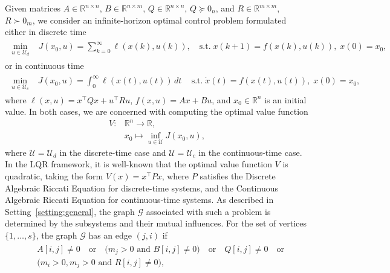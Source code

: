 \documentclass{article}
\newcommand{\R}{\mathbb{R}}
\newcommand{\Rn}{\R^n}
\begin{document}
Given matrices $A \in \mathbb{R}^{n \times n}$, $B \in \mathbb{R}^{n \times m}$, $Q \in \mathbb{R}^{n \times n}$, $Q\succeq 0_n$, and $R \in \mathbb{R}^{m \times m}$, $R\succ 0_m$, we consider an infinite-horizon optimal control problem formulated either in discrete time
\begin{align} \begin{split}  \label{eq:LQR_discrete}
		\min_{u \in \mathcal{U}_d} \; & J(x_0, u) = \sum_{k=0}^\infty \ell(x(k), u(k)), \quad   
		\text{s.t.} \; x(k+1) = f(x(k),u(k)), \;  x(0) = x_0, 
\end{split} \end{align}
or in continuous time 
\begin{align} \begin{split}  \label{eq:LQR_continuous}
		\min_{u \in \mathcal{U}_c} \; & J(x_0, u) = \int_0^{\infty} \ell(x(t), u(t)) \,dt\, \quad   
		\text{s.t.} \; \dot{x}(t) = f(x(t),u(t)), \;  x(0) = x_0, 
\end{split} \end{align}
where $\ell(x,u) = x^\top Q x + u^\top R u$, $f(x,u) = Ax + Bu$, and $x_0 \in \Rn$ is an initial value. In both cases, we are concerned with computing the optimal value function 
\begin{equation*}
\begin{aligned}
    V\colon &\mathbb{R}^n \to \mathbb{R}, \\
    &x_0 \mapsto \inf_{u \in \mathcal{U}} J(x_0, u),
\end{aligned}
\end{equation*}
where $\mathcal{U}=\mathcal{U}_d$ in the discrete-time case and $\mathcal{U}=\mathcal{U}_c$ in the continuous-time case.
In the LQR framework, it is well-known that the optimal value function $V$ is quadratic, taking the form $V(x) = x^\top P x$, where $P$ satisfies the Discrete Algebraic Riccati Equation for discrete-time systems, and the Continuous Algebraic Riccati Equation for continuous-time systems. As described in Setting~\ref{setting:general}, the graph $\mathcal{G}$ associated with such a problem is determined by the subsystems and their mutual influences. For the set of vertices $\{1, \dots, s\}$, the graph $\mathcal{G}$ has an edge $(j,i)$ if 
\begin{align}
    \begin{split} \label{eq.conditionEdge}
            & A[i,j] \neq 0 \quad \text{or} \quad \Big(m_j > 0 \text{ and } B[i,j] \neq 0  \Big) \quad \text{or} \quad Q[i,j] \neq 0 \quad \text{or} \\ 
    & \Big(m_i > 0, m_j > 0 \text{ and } R[i,j] \neq 0  \Big), 
    \end{split}
\end{align} 
\end{document}
